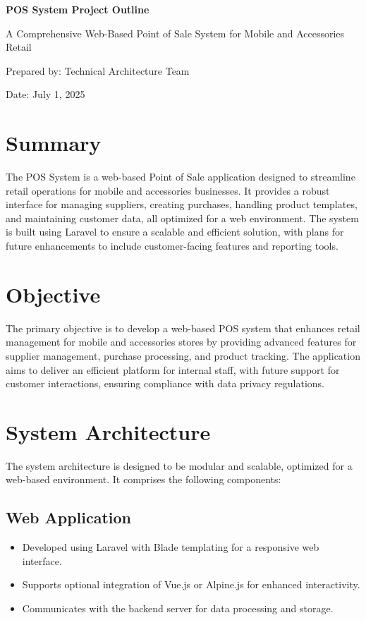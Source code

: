 \documentclass[a4paper,12pt]{article}
\begin{document}
\begin{titlepage}
    \centering
    \vspace*{2cm}
    {\huge\bfseries POS System Project Outline\par}
    \vspace{1cm}
    {\large A Comprehensive Web-Based Point of Sale System for Mobile and Accessories Retail\par}
    \vspace{2cm}
    {\normalsize Prepared by: Technical Architecture Team\par}
    \vspace{0.5cm}
    {\normalsize Date: July 1, 2025\par}
\end{titlepage}

\section{Summary}
The POS System is a web-based Point of Sale application designed to streamline retail operations for mobile and accessories businesses. It provides a robust interface for managing suppliers, creating purchases, handling product templates, and maintaining customer data, all optimized for a web environment. The system is built using Laravel to ensure a scalable and efficient solution, with plans for future enhancements to include customer-facing features and reporting tools.

\section{Objective}
The primary objective is to develop a web-based POS system that enhances retail management for mobile and accessories stores by providing advanced features for supplier management, purchase processing, and product tracking. The application aims to deliver an efficient platform for internal staff, with future support for customer interactions, ensuring compliance with data privacy regulations.

\section{System Architecture}
The system architecture is designed to be modular and scalable, optimized for a web-based environment. It comprises the following components:

\subsection{Web Application}
\begin{itemize}
    \item Developed using Laravel with Blade templating for a responsive web interface.
    \item Supports optional integration of Vue.js or Alpine.js for enhanced interactivity.
    \item Communicates with the backend server for data processing and storage.
\end{itemize}
\end{document}
